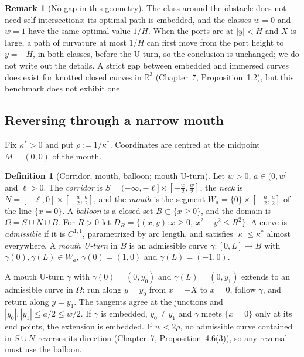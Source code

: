 \documentclass[11pt,reqno]{amsart}
\theoremstyle{definition}
\newtheorem{definition}[theorem]{Definition}
\newtheorem{remark}[theorem]{Remark}
\providecommand{\R}{\mathbb{R}}
\numberwithin{equation}{section}
\providecommand{\R}{\mathbb{R}}
\providecommand{\xref}[2]{#2}
\begin{document}
\begin{remark}[No gap in this geometry]
The class around the obstacle does not need self-intersections: its optimal path is embedded, and the classes $w = 0$ and $w = 1$ have the same optimal value $1/H$. When the ports are at $|y| < H$ and $X$ is large, a path of curvature at most $1/H$ can first move from the port height to $y = -H$, in both classes, before the U-turn, so the conclusion is unchanged; we do not write out the details. A strict gap between embedded and immersed curves does exist for knotted closed curves in $\R^3$ (Chapter~7, Proposition~\xref{chap07:prop:knot_gap}{1.2}), but this benchmark does not exhibit one.
\end{remark}

\subsection{Reversing through a narrow mouth}
\label{sec:mouth_uturn}

Fix $\kappa^*>0$ and put $\rho := 1/\kappa^*$. Coordinates are centred at the midpoint $M=(0,0)$ of the mouth.

\begin{definition}[Corridor, mouth, balloon; mouth U-turn]
\label{def:mouth_uturn}
Let $w>0$, $a\in(0,w]$ and $\ell>0$. The \emph{corridor} is $S=(-\infty,-\ell]\times[-\tfrac w2,\tfrac w2]$, the \emph{neck} is $N=[-\ell,0]\times[-\tfrac a2,\tfrac a2]$, and the \emph{mouth} is the segment $W_a=\{0\}\times[-\tfrac a2,\tfrac a2]$ of the line $\{x=0\}$. A \emph{balloon} is a closed set $B\subset\{x\ge0\}$, and the domain is $\Omega=S\cup N\cup B$. For $R>0$ let $D_R=\{(x,y): x\ge0,\ x^2+y^2\le R^2\}$. A curve is \emph{admissible} if it is $C^{1,1}$, parametrized by arc length, and satisfies $|\kappa|\le\kappa^*$ almost everywhere. A \emph{mouth U-turn} in $B$ is an admissible curve $\gamma\colon[0,L]\to B$ with $\gamma(0),\gamma(L)\in W_a$, $\dot\gamma(0)=(1,0)$ and $\dot\gamma(L)=(-1,0)$.
\end{definition}

A mouth U-turn $\gamma$ with $\gamma(0)=(0,y_0)$ and $\gamma(L)=(0,y_1)$ extends to an admissible curve in $\Omega$: run along $y=y_0$ from $x=-X$ to $x=0$, follow $\gamma$, and return along $y=y_1$. The tangents agree at the junctions and $|y_0|,|y_1|\le a/2\le w/2$. If $\gamma$ is embedded, $y_0\ne y_1$ and $\gamma$ meets $\{x=0\}$ only at its end points, the extension is embedded. If $w<2\rho$, no admissible curve contained in $S\cup N$ reverses its direction (Chapter~7, Proposition~\xref{chap07:thm:lower_bounds}{4.6}(3)), so any reversal must use the balloon.
\end{document}
